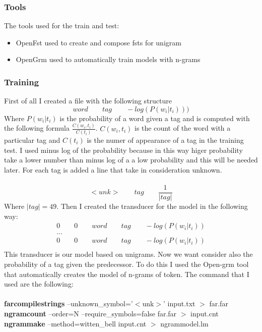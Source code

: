 \documentclass[a4paper,8pt,oneside]{article}
\begin{document}
		\subsubsection{Tools}
			The tools used for the train and test:
			\begin{itemize}
				\item OpenFst used to create and compose fsts for unigram
				\item OpenGrm used to automatically train models with n-grams
			\end{itemize}
		\subsubsection{Training}
			First of all I created a file with the following structure
			\begin{equation}
				word \qquad tag \qquad -log(P(w_i|t_i)))
			\end{equation}
			Where $P(w_i|t_i)$ is the probability of a word given a tag and is computed with the following formula $\frac{C(w_i,t_i)}{C(t_i)}$. $C(w_i,t_i)$ is the count of the word with a particular tag and $C(t_i)$ is the numer of appearance of a tag in the training test. I used minus log of the probability because in this way higer probability take a lower number than minus log of a  a low probability and this will be needed later. For each tag is added a line that take in consideration unknown.\\ \\ 
			\begin{equation}
				<unk> \qquad tag \qquad \frac{1}{|tag|}
			\end{equation}
			Where $|tag| = 49$. Then I created the transducer for the model in the following way:
			\begin{gather*}
					0 \qquad 0 \qquad word \qquad tag \qquad -log(P(w_i|t_i)) \\
					... \\
					0 \qquad 0 \qquad word \qquad tag \qquad -log(P(w_i|t_i)) \\
			\end{gather*} This transducer is our model based on unigrams. Now we want consider also the probability of a tag given the predecessor. To do this I used the Open-grm tool that automatically creates the model of n-grams of token. The command that I used are the following:\\ \\

			\noindent\textbf{farcompilestrings} --unknown\_symbol='$<$unk$>$' input.txt $>$ far.far \\
			\textbf{ngramcount} --order=N --require\_symbols=false far.far $>$ input.cnt \\
			\textbf{ngrammake} --method=witten\_bell input.cnt $>$ ngrammodel.lm \\ \\
\end{document}
